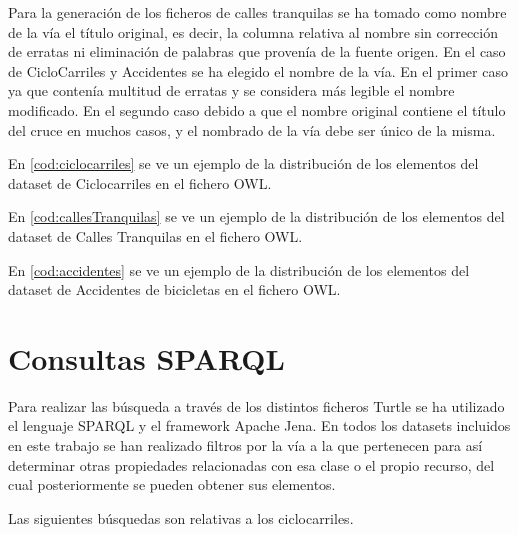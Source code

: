 Para la generación de los ficheros de calles tranquilas se ha tomado como nombre de la vía el título original, es decir, la columna relativa al nombre sin corrección de erratas ni eliminación de palabras que provenía de la fuente origen. En el caso de CicloCarriles y Accidentes se ha elegido el nombre de la vía. En el primer caso ya que contenía multitud de erratas y se considera más legible el nombre modificado. En el segundo caso debido a que el nombre original contiene el título del cruce en muchos casos, y el nombrado de la vía debe ser único de la misma.

En \ref{cod:ciclocarriles} se ve un ejemplo de la distribución de los elementos del dataset de Ciclocarriles en el fichero OWL.




En \ref{cod:callesTranquilas} se ve un ejemplo de la distribución de los elementos del dataset de Calles Tranquilas en el fichero OWL.




En \ref{cod:accidentes} se ve un ejemplo de la distribución de los elementos del dataset de Accidentes de bicicletas en el fichero OWL.









\clearpage
\section{Consultas SPARQL}

Para realizar las búsqueda a través de los distintos ficheros Turtle se ha utilizado el lenguaje SPARQL y el framework Apache Jena. En todos los datasets incluidos en este trabajo se han realizado filtros por la vía a la que pertenecen para así determinar otras propiedades relacionadas con esa clase o el propio recurso, del cual posteriormente se pueden obtener sus elementos.


Las siguientes búsquedas son relativas a los ciclocarriles.


